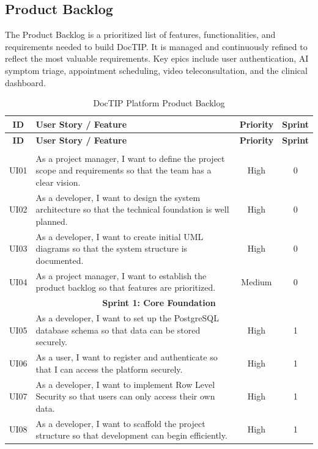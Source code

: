 \documentclass[12pt,a4paper,oneside]{report}
\begin{document}
\subsection{Product Backlog}

The Product Backlog is a prioritized list of features, functionalities, and requirements needed to build DocTIP. It is managed and continuously refined to reflect the most valuable requirements. Key epics include user authentication, AI symptom triage, appointment scheduling, video teleconsultation, and the clinical dashboard.

\begin{longtable}{|c|p{7.5cm}|c|c|}
\caption{DocTIP Platform Product Backlog}
\label{tab:product-backlog} \\
\hline
\textbf{ID} & \textbf{User Story / Feature} & \textbf{Priority} & \textbf{Sprint} \\
\hline
\endfirsthead
\hline
\textbf{ID} & \textbf{User Story / Feature} & \textbf{Priority} & \textbf{Sprint} \\
\hline
\endhead
\hline
\endfoot
\multicolumn{4}{|c|}{\textbf{Sprint 0: Analysis \& Planning}} \\
\hline
UI01 & As a project manager, I want to define the project scope and requirements so that the team has a clear vision. & High & 0 \\
\hline
UI02 & As a developer, I want to design the system architecture so that the technical foundation is well planned. & High & 0 \\
\hline
UI03 & As a developer, I want to create initial UML diagrams so that the system structure is documented. & High & 0 \\
\hline
UI04 & As a project manager, I want to establish the product backlog so that features are prioritized. & Medium & 0 \\
\hline
\multicolumn{4}{|c|}{\textbf{Sprint 1: Core Foundation}} \\
\hline
UI05 & As a developer, I want to set up the PostgreSQL database schema so that data can be stored securely. & High & 1 \\
\hline
UI06 & As a user, I want to register and authenticate so that I can access the platform securely. & High & 1 \\
\hline
UI07 & As a developer, I want to implement Row Level Security so that users can only access their own data. & High & 1 \\
\hline
UI08 & As a developer, I want to scaffold the project structure so that development can begin efficiently. & High & 1 \\

\end{longtable}
\end{document}
